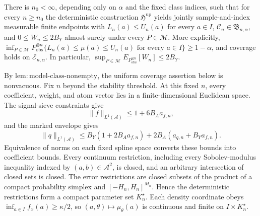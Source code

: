 There is \(n_0<\infty\), depending only on \(\alpha\) and the fixed class indices, such that for every \(n\ge n_0\) the deterministic construction \(\mathfrak H^{\mathrm{up}}\) yields jointly sample-and-index measurable finite endpoints with \(L_n(a)\le U_n(a)\) for every \(a\in I\), \(\mathcal C_n\in\mathfrak B_{n,\alpha}\), and \(0\le W_n\le2B_Y\) almost surely under every \(P\in\mathcal M\). More explicitly, \(\inf_{P\in\mathcal M}P_{\mathrm{obs}}^{\otimes n}\{L_n(a)\le\mu(a)\le U_n(a)\text{ for every }a\in I\}\ge1-\alpha\), and coverage holds on \(\mathcal E_{n,\alpha}\). In particular, \(\sup_{P\in\mathcal M}E_{P_{\mathrm{obs}}^{\otimes n}}[W_n]\le2B_Y\).

By \(\mathrm{lem{:}model\text{-}class\text{-}nonempty}\), the uniform coverage assertion below is nonvacuous.  Fix \(n\) beyond the stability threshold.  At this fixed \(n\), every coefficient, weight, and atom vector lies in a finite-dimensional Euclidean space.  The signal-sieve constraints give
\[
 \|f\|_{L^1(\mathcal A)}\le1+6B_Aa_{f,n},
\]
and the marked envelope gives
\[
 \|q\|_{L^1(\mathcal A)}
 \le B_Y(1+2B_Aa_{f,n})+2B_A(a_{q,n}+B_Ya_{f,n}).
\]
Equivalence of norms on each fixed spline space converts these bounds into coefficient bounds.  Every continuum restriction, including every Sobolev-modulus inequality indexed by \((a,b)\in\mathcal A^2\), is closed, and an arbitrary intersection of closed sets is closed.  The error restrictions are closed subsets of the product of a compact probability simplex and \([-H_n,H_n]^{M_n}\).  Hence the deterministic restrictions form a compact parameter set \(K_n^\star\).  Each density coordinate obeys \(\inf_{a\in I}f_x(a)\ge\kappa/2\), so \((a,\theta)\mapsto\mu_\theta(a)\) is continuous and finite on \(I\times K_n^\star\).

